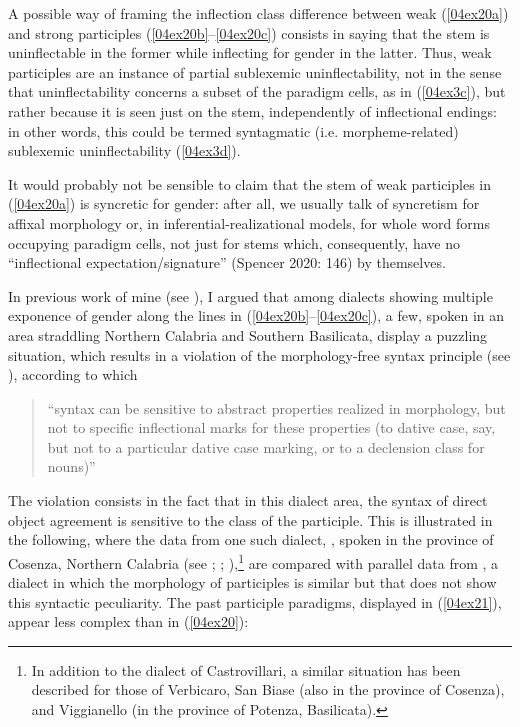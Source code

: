 \documentclass[output=paper,colorlinks,citecolor=brown]{langscibook}
\begin{document}
A possible way of framing the inflection class difference between weak (\ref{04ex20a}) and strong participles (\ref{04ex20b}--\ref{04ex20c}) consists in saying that the stem is uninflectable in the former while inflecting for gender in the latter. Thus, weak participles are an instance of partial sublexemic uninflectability, not in the sense that uninflectability concerns a subset of the paradigm cells, as in (\ref{04ex3c}), but rather because it is seen just on the stem, independently of inflectional endings: in other words, this could be termed syntagmatic (i.e. morpheme-related) sublexemic uninflectability (\ref{04ex3d}).

It would probably not be sensible to claim that the stem of weak participles in (\ref{04ex20a}) is syncretic for gender: after all, we usually talk of syncretism for affixal morphology or, in inferential-realizational models, for whole word forms occupying paradigm cells, not just for stems which, consequently, have no ``inflectional expectation/signature'' (Spencer 2020: 146) by themselves.

In previous work of mine (see \citealt[119--123]{loporcaro2015}), I argued that among dialects showing multiple exponence of gender along the lines in (\ref{04ex20b}--\ref{04ex20c}), a few, spoken in an area straddling Northern Calabria and Southern Basilicata, display a puzzling situation, which results in a violation of the morphology-free syntax principle (see \citealt{zwicky1983}), according to which

\begin{quote}
	``syntax can be sensitive to abstract properties realized in morphology, but not to specific inflectional marks for these properties (to dative case, say, but not to a particular dative case marking, or to a declension class for nouns)''
	
	\hfill \citep[301]{zwicky1996}
\end{quote}

The violation consists in the fact that in this dialect area, the syntax of direct object agreement is sensitive to the class of the participle. This is illustrated in the following, where the data from one such dialect, , spoken in the province of Cosenza, Northern Calabria (see \citealt[128--147]{pace1993-94}; \citealt[167--171]{loporcaro2010-change}; \citealt[119--123]{loporcaro2015}),\footnote{In addition to the dialect of Castrovillari, a similar situation has been described \citep[350--353]{loporcarosilvestri2011} for those of Verbicaro, San Biase (also in the province of Cosenza), and Viggianello (in the province of Potenza, Basilicata).} are compared with parallel data from , a dialect in which the morphology of participles is similar but that does not show this syntactic peculiarity. The  past participle paradigms, displayed in (\ref{04ex21}), appear less complex than in  (\ref{04ex20}):
\end{document}

